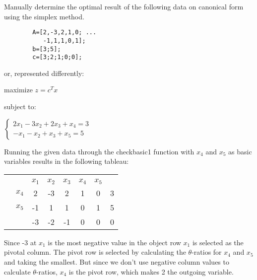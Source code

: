 \documentclass{article}
\begin{document}
    Manually determine the optimal result of the following data on canonical
    form using the simplex method.

    \begin{lstlisting}
        A=[2,-3,2,1,0; ...
           -1,1,1,0,1];
        b=[3;5];
        c=[3;2;1;0;0];
    \end{lstlisting}

    or, represented differently:

    \begin{center}
        maximize $ z = c^Tx $
    \end{center}

    subject to:

    \begin{center}
        \begin{math}
            \begin{cases}
                2x_1 - 3x_2 + 2x_3 + x_4 = 3\\
                -x_1 - x_2 + x_3 + x_5 = 5
            \end{cases}
        \end{math}
    \end{center}

    Running the given data through the checkbasic1 function with $x_4$ and
    $x_5$ as basic variables results in the following tableau:

    \begin{center}
        \begin{tabular}{ c | c | c c c c c | c | }
            \multicolumn{1}{c}{}  & \multicolumn{1}{c}{}  &       &       &       & \multicolumn{1}{c}{}\\
            \cline{2-8}
            &  & $x_1$ & $x_2$ & $x_3$ & $x_4$ & $x_5$ &\\
            \cline{2-8}
                          &  $x_4$ &2 &-3 &2 &1 &0 &3\\
                          &  $x_5$ &-1 &1 &1 &0 &1 &5\\
            \cline{2-8}
                          &        &-3 &-2 &-1 &0 &0 &0\\
            \cline{2-8}
        \end{tabular}
    \end{center}

    Since -3 at $x_1$ is the most negative value in the object row $x_1$ is
    selected as the pivotal column. The pivot row is selected by calculating
    the $\theta$-ratios for $x_4$ and $x_5$ and taking the smallest. But since
    we don't use negative column values to calculate $\theta$-ratios, $x_4$ is
    the pivot row, which makes 2 the outgoing variable.
\end{document}
